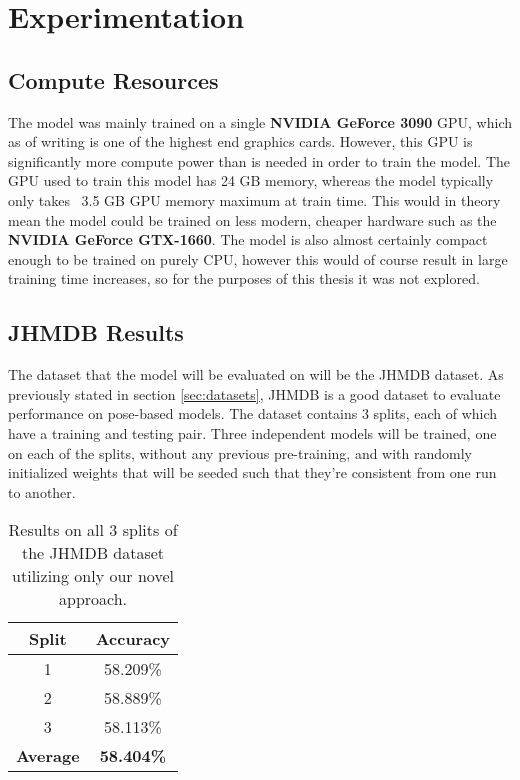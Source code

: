 
\chapter{Experimentation} %

\label{Experimentation} %

\section{Compute Resources}

The model was mainly trained on a single \textbf{NVIDIA GeForce 3090} GPU, which as of writing is one of the highest end graphics cards. However, this GPU is significantly more compute power than is needed in order to train the model. The GPU used to train this model has 24 GB memory, whereas the model typically only takes ~3.5 GB GPU memory maximum at train time. This would in theory mean the model could be trained on less modern, cheaper hardware such as the \textbf{NVIDIA GeForce GTX-1660}. The model is also almost certainly compact enough to be trained on purely CPU, however this would of course result in large training time increases, so for the purposes of this thesis it was not explored.

\section{JHMDB Results}
\label{sec:JHMDBResults}

The dataset that the model will be evaluated on will be the JHMDB dataset. As previously stated in section \ref{sec:datasets}, JHMDB is a good dataset to evaluate performance on pose-based models. The dataset contains 3 splits, each of which have a training and testing pair. Three independent models will be trained, one on each of the splits, without any previous pre-training, and with randomly initialized weights that will be seeded such that they're consistent from one run to another.

\begin{table}[ht]
	\centering
	\begin{tabular}{||c c||} 
		\hline
		\textbf{Split} & \textbf{Accuracy} \\ [0.5ex] 
		\hline\hline
		1 & 58.209\% \\ 
		\hline
		2 & 58.889\% \\
		\hline
		3 & 58.113\% \\
		\hline
		\hline
		\textbf{Average} & \textbf{58.404\%} \\
		\hline
	\end{tabular}
	\caption{Results on all 3 splits of the JHMDB dataset utilizing only our novel approach.}
	\label{tab:acc-results}
\end{table}

